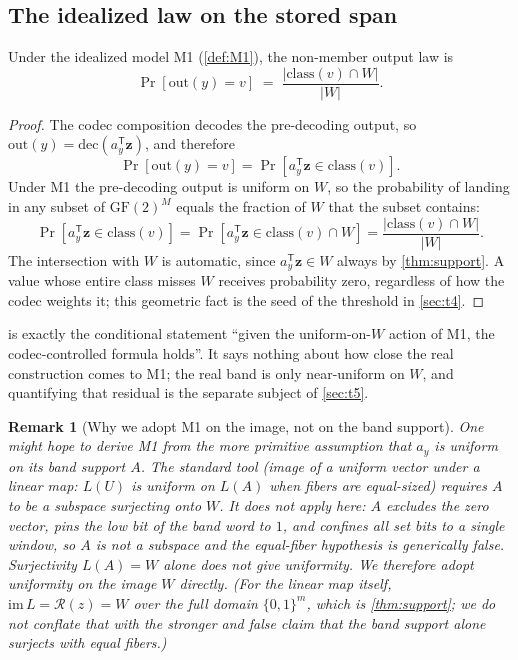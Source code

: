 \documentclass[acmsmall,review]{acmart}
\newtheorem{remark}{Remark}
\newcommand{\dec}{\mathrm{dec}}
\newcommand{\B}{\{0,1\}}
\newcommand{\GF}{\mathrm{GF}(2)}
\newcommand{\class}{\mathrm{class}}
\newcommand{\W}{W}                          %
\newcommand{\Rz}{\mathcal{R}(z)}            %
\newcommand{\bz}{\mathbf{z}}                %
\newcommand{\ay}{a_y}                       %
\newcommand{\inter}{\cap}
\begin{document}
\subsection{The idealized law on the stored span}

\begin{theorem}
\label{thm:idealized}
Under the idealized model M1 (\cref{def:M1}), the non-member output law is
\begin{equation}
  \Pr[\mathrm{out}(y) = v] \;=\; \frac{|\class(v) \inter \W|}{|\W|}.
  \label{eq:idealized}
\end{equation}
\end{theorem}

\begin{proof}
The codec composition decodes the pre-decoding output, so
$\mathrm{out}(y) = \dec(\ay^{\mathsf T}\bz)$, and therefore
\[
  \Pr[\mathrm{out}(y) = v] = \Pr[\ay^{\mathsf T}\bz \in \class(v)].
\]
Under M1 the pre-decoding output is uniform on $\W$, so the probability of landing in
any subset of $\GF^M$ equals the fraction of $\W$ that the subset contains:
\[
  \Pr[\ay^{\mathsf T}\bz \in \class(v)]
  = \Pr[\ay^{\mathsf T}\bz \in \class(v) \inter \W]
  = \frac{|\class(v) \inter \W|}{|\W|}.
\]
The intersection with $\W$ is automatic, since $\ay^{\mathsf T}\bz \in \W$ always by
\cref{thm:support}. A value whose entire class misses $\W$ receives probability zero,
regardless of how the codec weights it; this geometric fact is the seed of the
threshold in \cref{sec:t4}.
\end{proof}

 is exactly the conditional statement ``given the uniform-on-$\W$
action of M1, the codec-controlled formula holds''. It says nothing about how close
the real construction comes to M1; the real band is only near-uniform on $\W$, and
quantifying that residual is the separate subject of \cref{sec:t5}.

\begin{remark}[Why we adopt M1 on the image, not on the band support]
One might hope to derive M1 from the more primitive assumption that $\ay$ is uniform
on its band support $A$. The standard tool (image of a uniform vector under a linear
map: $L(U)$ is uniform on $L(A)$ when fibers are equal-sized) requires $A$ to be a
subspace surjecting onto $\W$. It does not apply here: $A$ excludes the zero vector,
pins the low bit of the band word to $1$, and confines all set bits to a single
window, so $A$ is not a subspace and the equal-fiber hypothesis is generically false.
Surjectivity $L(A) = \W$ alone does not give uniformity. We therefore adopt uniformity
on the image $\W$ directly. (For the linear map itself, $\mathrm{im}\, L = \Rz = \W$
over the \emph{full} domain $\B^m$, which is \cref{thm:support}; we do not conflate
that with the stronger and false claim that the band support alone surjects with equal
fibers.)
\end{remark}
\end{document}
